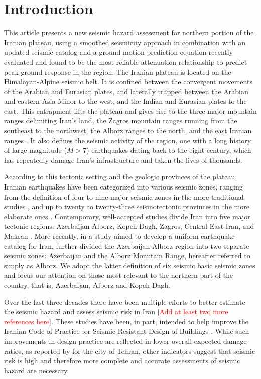 
\section{Introduction}

This article presents a new seismic hazard assessment for northern portion of the Iranian plateau, using a smoothed seismicity approach in combination with an updated seismic catalog and a ground motion prediction equation recently evaluated and found to be the most reliable attenuation relationship to predict peak ground response in the region. The Iranian plateau is located on the Himalayan-Alpine seismic belt. It is confined between the convergent movements of the Arabian and Eurasian plates, and laterally trapped between the Arabian and eastern Asia-Minor to the west, and the Indian and Eurasian plates to the east. This entrapment lifts the plateau and gives rise to the three major mountain ranges delimiting Iran's land, the Zagros mountain ranges running from the southeast to the northwest, the Alborz ranges to the north, and the east Iranian ranges \citep[e.g.,][]{Berberian_1981_Chap}. It also defines the seismic activity of the region, one with a long history of large magnitude ($M>7$) earthquakes dating back to the eight century, which has repeatedly damage Iran's infrastructure and taken the lives of thousands. 

According to this tectonic setting and the geologic provinces of the plateau, Iranian earthquakes have been categorized into various seismic zones, ranging from the definition of four to nine major seismic zones in the more traditional studies \citep[e.g.,][]{Stocklin1968, Takin1972, Berberian1976}, and up to twenty to twenty-three seismotectonic provinces in the more elaborate ones \citep[e.g.,][]{Nowroozi1976, Tavakoli1999}. Contemporary, well-accepted studies divide Iran into five major tectonic regions: Azerbaijan-Alborz, Kopeh-Dagh, Zagros, Central-East Iran, and Makran \citep[e.g.,][]{Mirzaei1998}. More recently, in a study aimed to develop a uniform earthquake catalog for Iran, \citet{Karimiparidari2013} further divided the Azerbaijan-Alborz region into two separate seismic zones: Azerbaijan and the Alborz Mountain Range, hereafter referred to simply as Alborz. We adopt the latter definition of six seismic basic seismic zones and focus our attention on those most relevant to the northern part of the country, that is, Azerbaijan, Alborz and Kopeh-Dagh.

Over the last three decades there have been multiple efforts to better estimate the seismic hazard and assess seismic risk in Iran \citep[e.g.,][]{Tavakoli1999} [\textcolor{red}{Add at least two more references here}]. These studies have been, in part, intended to help improve the Iranian Code of Practice for Seismic Resistant Design of Buildings \citep{BHRC2014}. While such improvements in design practice are reflected in lower overall expected damage ratios, as reported by \citet{Ghodrati2013} for the city of Tehran, other indicators suggest that seismic risk is high and therefore more complete and accurate assessments of seismic hazard are necessary. 

